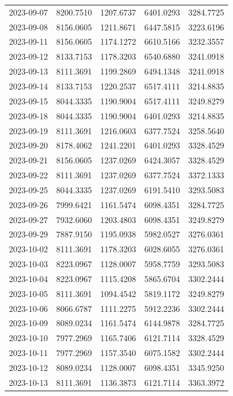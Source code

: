 {\begin{longtable}{lllll}
2023-09-07 & 8200.7510 & 1207.6737 & 6401.0293 & 3284.7725 \\
2023-09-08 & 8156.0605 & 1211.8671 & 6447.5815 & 3223.6196 \\
2023-09-11 & 8156.0605 & 1174.1272 & 6610.5166 & 3232.3557 \\
2023-09-12 & 8133.7153 & 1178.3203 & 6540.6880 & 3241.0918 \\
2023-09-13 & 8111.3691 & 1199.2869 & 6494.1348 & 3241.0918 \\
2023-09-14 & 8133.7153 & 1220.2537 & 6517.4111 & 3214.8835 \\
2023-09-15 & 8044.3335 & 1190.9004 & 6517.4111 & 3249.8279 \\
2023-09-18 & 8044.3335 & 1190.9004 & 6401.0293 & 3214.8835 \\
2023-09-19 & 8111.3691 & 1216.0603 & 6377.7524 & 3258.5640 \\
2023-09-20 & 8178.4062 & 1241.2201 & 6401.0293 & 3328.4529 \\
2023-09-21 & 8156.0605 & 1237.0269 & 6424.3057 & 3328.4529 \\
2023-09-22 & 8111.3691 & 1237.0269 & 6377.7524 & 3372.1333 \\
2023-09-25 & 8044.3335 & 1237.0269 & 6191.5410 & 3293.5083 \\
2023-09-26 & 7999.6421 & 1161.5474 & 6098.4351 & 3284.7725 \\
2023-09-27 & 7932.6060 & 1203.4803 & 6098.4351 & 3249.8279 \\
2023-09-29 & 7887.9150 & 1195.0938 & 5982.0527 & 3276.0361 \\
2023-10-02 & 8111.3691 & 1178.3203 & 6028.6055 & 3276.0361 \\
2023-10-03 & 8223.0967 & 1128.0007 & 5958.7759 & 3293.5083 \\
2023-10-04 & 8223.0967 & 1115.4208 & 5865.6704 & 3302.2444 \\
2023-10-05 & 8111.3691 & 1094.4542 & 5819.1172 & 3249.8279 \\
2023-10-06 & 8066.6787 & 1111.2275 & 5912.2236 & 3302.2444 \\
2023-10-09 & 8089.0234 & 1161.5474 & 6144.9878 & 3284.7725 \\
2023-10-10 & 7977.2969 & 1165.7406 & 6121.7114 & 3328.4529 \\
2023-10-11 & 7977.2969 & 1157.3540 & 6075.1582 & 3302.2444 \\
2023-10-12 & 8089.0234 & 1128.0007 & 6098.4351 & 3345.9250 \\
2023-10-13 & 8111.3691 & 1136.3873 & 6121.7114 & 3363.3972 \\

\end{longtable}}
